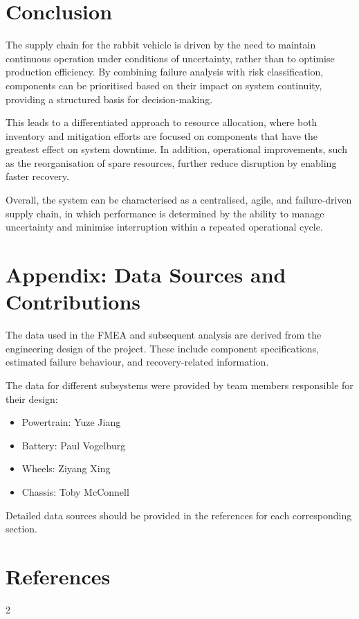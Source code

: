 \documentclass[11pt, a4paper]{report}
\numberwithin{equation}{section}
\newcommand{\compactbib}{%
  \vspace{-16pt}%
  \enlargethispage{20pt}%
  \section*{References}%
  \vspace{-33pt}%
  \begingroup
    \begin{singlespace}%
      \begin{multicols}{2}%
        \scriptsize
        \setlength{\bibitemsep}{0pt}%
        \printbibliography[heading=none]%
      \end{multicols}%
    \end{singlespace}%
  \endgroup
}
\begin{document}
\section{Conclusion}

The supply chain for the rabbit vehicle is driven by the need to maintain continuous operation under conditions of uncertainty, rather than to optimise production efficiency. By combining failure analysis with risk classification, components can be prioritised based on their impact on system continuity, providing a structured basis for decision-making.

This leads to a differentiated approach to resource allocation, where both inventory and mitigation efforts are focused on components that have the greatest effect on system downtime. In addition, operational improvements, such as the reorganisation of spare resources, further reduce disruption by enabling faster recovery.

Overall, the system can be characterised as a centralised, agile, and failure-driven supply chain, in which performance is determined by the ability to manage uncertainty and minimise interruption within a repeated operational cycle.

\section*{Appendix: Data Sources and Contributions}

The data used in the FMEA and subsequent analysis are derived from the engineering design of the project. These include component specifications, estimated failure behaviour, and recovery-related information.

The data for different subsystems were provided by team members responsible for their design:

\begin{itemize}
    \item Powertrain: Yuze Jiang
    \item Battery: Paul Vogelburg
    \item Wheels: Ziyang Xing
    \item Chassis: Toby McConnell
\end{itemize}

Detailed data sources should be provided in the references for each corresponding section.

\compactbib
\end{document}
